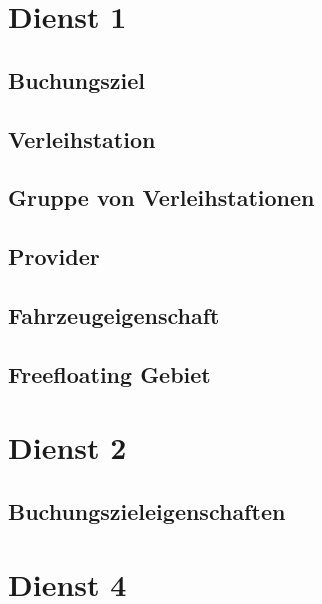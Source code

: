 \section{Dienst 1}
\label{subsec:Datenmodell:Dienst1}

\subsection*{Buchungsziel}



\subsection*{Verleihstation}


\subsection*{Gruppe von Verleihstationen}


\subsection*{Provider}



\subsection*{Fahrzeugeigenschaft}


\subsection*{Freefloating Gebiet}


\section{Dienst 2}
\label{subsec:Datenmodell:Dienst2}

\subsection*{Buchungszieleigenschaften}





\section{Dienst 4}
\label{subsec:Datenmodell:Dienst4}

